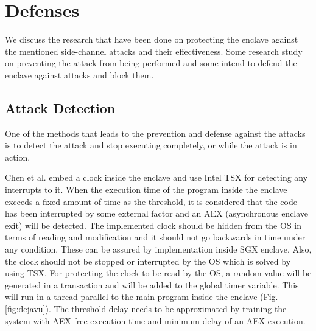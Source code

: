 \section{Defenses}
We discuss the research that have been done on protecting the enclave against the mentioned side-channel attacks and their effectiveness. Some research study on preventing the attack from being performed and some intend to defend the enclave against attacks and block them.

\subsection{Attack Detection}%
One of the methods that leads to the prevention and defense against the attacks is to detect the attack and stop executing completely, or while the attack is in action.

Chen et al. \cite{dejavu} embed a clock inside the enclave and use Intel TSX for detecting any interrupts to it. When the execution time of the program inside the enclave exceeds a fixed amount of time as the threshold, it is considered that the code has been interrupted by some external factor and an AEX (asynchronous enclave exit) will be detected. The implemented clock should be hidden from the OS in terms of reading and modification and it should not go backwards in time under any condition. These can be assured by implementation inside SGX enclave. Also, the clock should not be stopped or interrupted by the OS which is solved by using TSX. For protecting the clock to be read by the OS, a random value will be generated in a transaction and will be added to the global timer variable. This will run in a thread parallel to the main program inside the enclave (Fig. \ref{fig:dejavu}). The threshold delay needs to be approximated by training the system with AEX-free execution time and minimum delay of an AEX execution.

